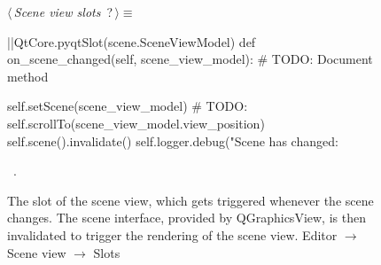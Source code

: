 \documentclass[%
    a4paper,    %
    justified,  %
    nobib,      %
    openany     %
]{tufte-book}
\makeatletter
\renewcommand{\label}[1]{\@tufte@label{##1}}%
\makeatother
\begin{document}
\begin{figure}
\begin{flushleft} \small
\begin{minipage}{\linewidth}\label{scrap97}\raggedright\small
{} $\langle\,${\itshape Scene view slots}\nobreak\ {\footnotesize {?}}$\,\rangle\equiv$
\vspace{-1ex}
\begin{pythoncode}
|\normalfont{}\fontfamily{}|QtCore.pyqtSlot(scene.SceneViewModel)
def on_scene_changed(self, scene_view_model):
    # TODO: Document method

    self.setScene(scene_view_model)
    # TODO: self.scrollTo(scene_view_model.view_position)
    self.scene().invalidate()
    self.logger.debug("Scene has changed: %
\end{pythoncode}
\vspace{1.5ex}
\footnotesize
\begin{list}{}{\setlength{\itemsep}{-\parsep}\setlength{\itemindent}{-\leftmargin}}
\item \NWtxtMacroRefIn\ .

\item{}
\end{list}
\end{minipage}\vspace{4ex}
\end{flushleft}
\caption{The slot of the scene view, which gets triggered whenever the scene
  changes. The scene interface, provided by QGraphicsView, is then invalidated
  to trigger the rendering of the scene view.
  \newline{}\newline{}Editor $\rightarrow$ Scene view $\rightarrow$
  Slots}
\label{editor:lst:scene-view:slots:on-scene-changed}
\end{figure}
\end{document}
